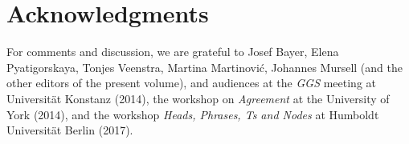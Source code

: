 \documentclass[output=paper
,modfonts
,nonflat]{langsci/langscibook}
\begin{document}
\section*{Acknowledgments}
For comments and discussion, we are grateful to Josef Bayer, Elena
Pyatigorskaya, Tonjes Veenstra, Martina Martinovi\'c, Johannes Mursell
(and the other editors of the present volume), and audiences at the
{\it GGS} meeting at Universit{\"a}t Konstanz (2014), the workshop on
{\it Agreement} at the University of York (2014), and the workshop
{\it Heads, Phrases, Ts and Nodes} at Humboldt Universit{\"a}t Berlin (2017).

{\sloppy
\printbibliography[heading=subbibliography,notkeyword=this]}
\end{document}
